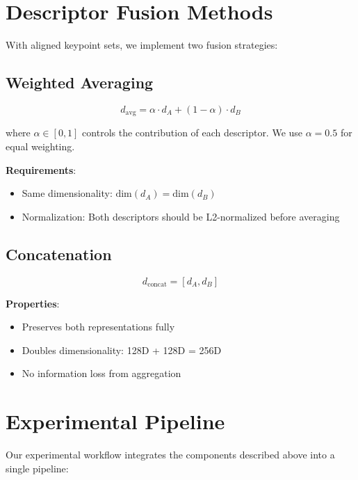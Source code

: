 \section{Descriptor Fusion Methods}

With aligned keypoint sets, we implement two fusion strategies:

\subsection{Weighted Averaging}

\begin{equation}
    d_{\text{avg}} = \alpha \cdot d_A + (1 - \alpha) \cdot d_B
\end{equation}

where $\alpha \in [0, 1]$ controls the contribution of each descriptor. We use $\alpha = 0.5$ for equal weighting.

\textbf{Requirements}:
\begin{itemize}
    \item Same dimensionality: $\text{dim}(d_A) = \text{dim}(d_B)$
    \item Normalization: Both descriptors should be L2-normalized before averaging
\end{itemize}

\subsection{Concatenation}

\begin{equation}
    d_{\text{concat}} = [d_A, d_B]
\end{equation}

\textbf{Properties}:
\begin{itemize}
    \item Preserves both representations fully
    \item Doubles dimensionality: 128D + 128D = 256D
    \item No information loss from aggregation
\end{itemize}

\section{Experimental Pipeline}

Our experimental workflow integrates the components described above into a single pipeline:

